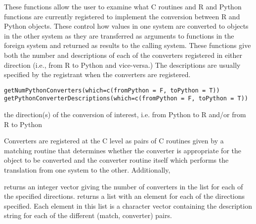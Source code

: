 \begin{Description}\relax
These functions allow the user to examine what C routines
and R and Python functions are currently registered
to implement the conversion between R and Python objects.
These control how values in one system are converted
to objects in the other system as they are transferred
as arguments to functions in the foreign system
and returned as results to the calling system.
These functions give both the number 
and descriptions of each of the converters registered
in either direction (i.e., from R to Python and vice-versa.)
The descriptions are usually specified by the registrant when the converters are
registered.\end{Description}
\begin{Usage}
\begin{verbatim}
getNumPythonConverters(which=c(fromPython = F, toPython = T))
getPythonConverterDescriptions(which=c(fromPython = F, toPython = T))
\end{verbatim}
\end{Usage}
\begin{Arguments}
\begin{ldescription}
\item[\code{which}] the direction(s) of the conversion of interest, i.e. 
from Python to R and/or from R to Python
\end{ldescription}
\end{Arguments}
\begin{Details}\relax
Converters are registered at the C level as pairs
of C routines given by a matching routine that determines
whether the converter is appropriate for the object to be converted
and the  converter routine itself which performs the translation from one
system to the other. Additionally,\end{Details}
\begin{Value}
 returns an integer vector
giving the number of converters in the list for each of
the specified directions.
 returns a list
with an element for each of the directions specified.
Each element in this list is a character vector 
containing the description string for each of the 
different (match, converter) pairs.\end{Value}
